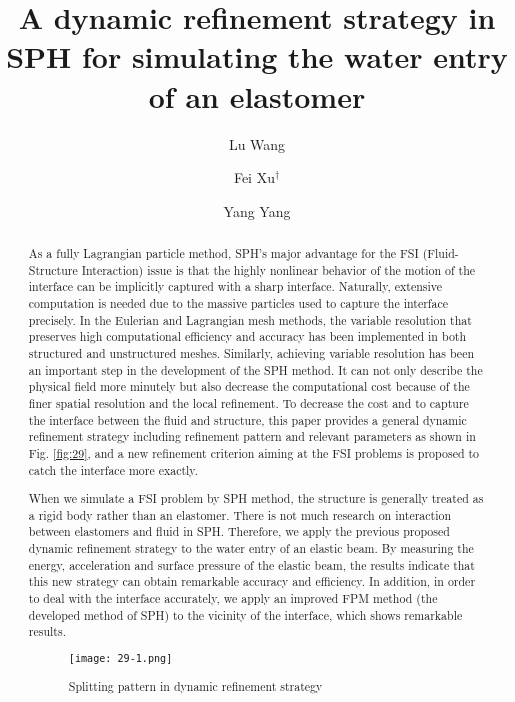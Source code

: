 \documentclass[10pt]{article}
\title{A dynamic refinement strategy in SPH for simulating the water entry of an elastomer}
\date{}
\author[$\relax$]{Lu Wang}
\author[$\relax$]{Fei Xu$^\dagger$}
\author[$\relax$]{Yang Yang}
\affil[$\relax$]{School of Aeronautics, Northwestern Polytechnical University, 710072, Xi'an, P. R. China}
\affil[$\relax$]{\email{\dagger}{xufei@nwpu.edu.cn}}
\begin{document}
\maketitle


\begin{abstract}
As a fully Lagrangian particle method, SPH's major advantage for the FSI (Fluid-Structure Interaction) issue is that the highly nonlinear behavior of the motion of the interface can be implicitly captured with a sharp interface. Naturally, extensive computation is needed due to the massive particles used to capture the interface precisely. In the Eulerian and Lagrangian mesh methods, the variable resolution that preserves high computational efficiency and accuracy has been implemented in both structured and unstructured meshes. Similarly, achieving variable resolution has been an important step in the development of the SPH method. It can not only describe the physical field more minutely but also decrease the computational cost because of the finer spatial resolution and the local refinement. To decrease the cost and to capture the interface between the fluid and structure, this paper provides a general dynamic refinement strategy including refinement pattern and relevant parameters as shown in Fig. \ref{fig:29}, and a new refinement criterion aiming at the FSI problems is proposed to catch the interface more exactly.

When we simulate a FSI problem by SPH method, the structure is generally treated as a rigid body rather than an elastomer. There is not much research on interaction between elastomers and fluid in SPH. Therefore, we apply the previous proposed dynamic refinement strategy to the water entry of an elastic beam. By measuring the energy, acceleration and surface pressure of the elastic beam, the results indicate that this new strategy can obtain remarkable accuracy and efficiency. In addition, in order to deal with the interface accurately, we apply an improved FPM method (the developed method of SPH) to the vicinity of the interface, which shows remarkable results.

\begin{figure}[!htb]
\centering
\texttt{[image: 29-1.png]}
\caption{Splitting pattern in dynamic refinement strategy}\label{fig:29}
\end{figure}

\end{abstract}



\addbib
\end{document}
